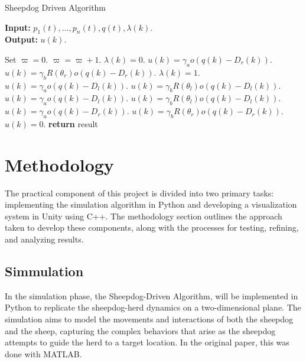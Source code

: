 \documentclass[9pt]{pnas-new}
\begin{document}
\begin{algorithm}[H]
\caption{Sheepdog Driven Algorithm \cite{liu2021}}
\label{alg:sheepdog}
\textbf{Input:} $p_1(t), \dots, p_n(t), q(t), \lambda(k)$. \\
\textbf{Output:} $u(k)$.
\begin{algorithmic}[1]
\State Set $\varpi = 0$.
        \State $\varpi = \varpi + 1$.
    \EndIf
\EndFor
{}
        \State $\lambda(k) = 0$.
            \State $u(k) = \gamma_a o(q(k) - D_r(k))$.
        \Else
            \State $u(k) = \gamma_b R(\theta_r) o(q(k) - D_r(k))$.
        \EndIf
        \State $\lambda(k) = 1$.
            \State $u(k) = \gamma_a o(q(k) - D_l(k))$.
        \Else
            \State $u(k) = \gamma_b R(\theta_l) o(q(k) - D_l(k))$.
        \EndIf
            \State $u(k) = \gamma_a o(q(k) - D_l(k))$.
        \Else
            \State $u(k) = \gamma_b R(\theta_l) o(q(k) - D_l(k))$.
        \EndIf
    \Else
            \State $u(k) = \gamma_a o(q(k) - D_r(k))$.
        \Else
            \State $u(k) = \gamma_b R(\theta_r) o(q(k) - D_r(k))$.
        \EndIf
    \EndIf
\Else
    \State $u(k) = 0$.
\EndIf
\State \textbf{return} result
\end{algorithmic}
\end{algorithm}


\section*{Methodology}

The practical component of this project is divided into two primary tasks: implementing the simulation algorithm in Python and developing a visualization system in Unity using C++. The methodology section outlines the approach taken to develop these components, along with the processes for testing, refining, and analyzing results.

\subsection*{Simmulation}

In the simulation phase, the Sheepdog-Driven Algorithm, will be implemented in Python to replicate the sheepdog-herd dynamics on a two-dimensional plane. The simulation aims to model the movements and interactions of both the sheepdog and the sheep, capturing the complex behaviors that arise as the sheepdog attempts to guide the herd to a target location. In the original paper, this was done with MATLAB.
\end{document}

